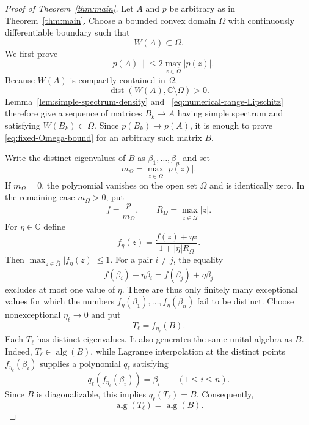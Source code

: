 \documentclass[preprints,article,submit,oneauthor]{Definitions/mdpi}
\theoremstyle{mdpi}
\theoremstyle{definition}
\newcommand{\C}{\mathbb C}
\newcommand{\alg}{\operatorname{alg}}
\newcommand{\distop}{\operatorname{dist}}
\begin{document}
\begin{proof}[Proof of Theorem~\ref{thm:main}]
Let $A$ and $p$ be arbitrary as in Theorem~\ref{thm:main}.  Choose a
bounded convex domain $\Omega$ with continuously differentiable boundary
such that
\begin{equation}
  W(A)\subset\Omega.
  \label{eq:WA-in-Omega}
\end{equation}
We first prove
\begin{equation}
  \lVert p(A)\rVert
  \leq2\max_{z\in\overline\Omega}\lvert p(z)\rvert.
  \label{eq:fixed-Omega-bound}
\end{equation}
Because $W(A)$ is compactly contained in $\Omega$,
\[
  \distop(W(A),\C\setminus\Omega)>0.
\]
Lemma~\ref{lem:simple-spectrum-density} and~%
\eqref{eq:numerical-range-Lipschitz} therefore give a sequence of
matrices $B_k\to A$ having simple spectrum and satisfying
$W(B_k)\subset\Omega$.  Since $p(B_k)\to p(A)$, it is enough to prove~%
\eqref{eq:fixed-Omega-bound} for an arbitrary such matrix $B$.

Write the distinct eigenvalues of $B$ as
$\beta_1,\ldots,\beta_n$ and set
\begin{equation}
  m_\Omega=\max_{z\in\overline\Omega}\lvert p(z)\rvert.
  \label{eq:m-Omega}
\end{equation}
If $m_\Omega=0$, the polynomial vanishes on the open set $\Omega$ and
is identically zero.  In the remaining case $m_\Omega>0$, put
\begin{equation}
  f=\frac{p}{m_\Omega},
  \qquad
  R_\Omega=\max_{z\in\overline\Omega}\lvert z\rvert.
  \label{eq:normalized-f}
\end{equation}
For $\eta\in\C$ define
\begin{equation}
  f_\eta(z)=
  \frac{f(z)+\eta z}{1+\lvert\eta\rvert R_\Omega}.
  \label{eq:f-eta}
\end{equation}
Then
$\max_{z\in\overline\Omega}\lvert f_\eta(z)\rvert\leq1$.
For a pair $i\neq j$,
the equality
\[
  f(\beta_i)+\eta\beta_i
  =f(\beta_j)+\eta\beta_j
\]
excludes at most one value of $\eta$.  There are thus only finitely
many exceptional values for which the numbers
$f_\eta(\beta_1),\ldots,f_\eta(\beta_n)$ fail to be distinct.  Choose
nonexceptional $\eta_\ell\to0$ and put
\begin{equation}
  T_\ell=f_{\eta_\ell}(B).
  \label{eq:T-ell}
\end{equation}
Each $T_\ell$ has distinct eigenvalues.  It also generates the same
unital algebra as $B$.  Indeed, $T_\ell\in\alg(B)$, while Lagrange
interpolation at the distinct points
$f_{\eta_\ell}(\beta_i)$ supplies a polynomial $q_\ell$ satisfying
\[
  q_\ell(f_{\eta_\ell}(\beta_i))=\beta_i
  \qquad(1\leq i\leq n).
\]
Since $B$ is diagonalizable, this implies
$q_\ell(T_\ell)=B$.  Consequently,
\begin{equation}
  \alg(T_\ell)=\alg(B).
  \label{eq:T-generates-B}
\end{equation}


\end{proof}
\end{document}
